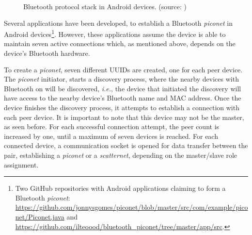 \begin{figure}[ht]
	\noindent{}
	\caption{\label{fig:btstack} Bluetooth protocol stack in Android devices. (source: \cite{androidbtintro})}
\end{figure}

Several applications have been developed, to establish a Bluetooth \textit{piconet} in Android devices\footnote{Two GitHub repositories with Android applications claiming to form a Bluetooth \textit{piconet}: \url{https://github.com/jonnysgomes/piconet/blob/master/src/com/example/piconet/Piconet.java} and \url{https://github.com/ilteoood/bluetooth_piconet/tree/master/app/src}.}. However, these applications assume the device is able to maintain seven active connections which, as mentioned above, depends on the device's Bluetooth hardware.

To create a \textit{piconet}, seven different \glspl{UUID} are created, one for each peer device. The \textit{piconet} initiator, starts a discovery process, where the nearby devices with Bluetooth on will be discovered, \textit{i.e.}, the device that initiated the discovery will have access to the nearby device's Bluetooth name and \gls{MAC} address. Once the device finishes the discovery process, it attempts to establish a connection with each peer device. It is important to note that this device may not be the master, as seen before. For each successful connection attempt, the peer count is increased by one, until a maximum of seven devices is reached. For each connected device, a communication socket is opened for data transfer between the pair, establishing a \textit{piconet} or a \textit{scatternet}, depending on the master/slave role assignment.

